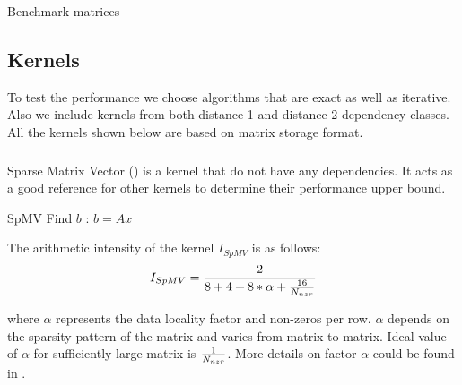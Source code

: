 \begin{table}[ht]
	\footnotesize
	\caption{Benchmark matrices}\label{tab:test_mtx}
	\label{table:bench_matrices}
	\begin{center}
		
	\end{center}

\end{table}

\subsection{Kernels}
To test the performance we choose algorithms that are exact as well as iterative. Also we include kernels from both distance-1 and distance-2 dependency classes. All the kernels shown below are based on \CRS matrix storage format.

\subsubsection{\SpMV}
Sparse Matrix Vector (\SpMV) is a kernel that do not have any dependencies. It  acts as a good reference for other kernels to determine their performance upper bound.
\begin{algorithm}[H]
	\caption{SpMV Find $b$ : $b=A x$} 
	\label{alg:SpMV}
	\begin{algorithmic}[1]
		\ENDFOR
		\ENDFOR
	\end{algorithmic}
\end{algorithm}
The arithmetic intensity of the kernel $I_{SpMV}$ is as follows:
\begin{equation}
\label{eq:SpMV_intensity}
I_{\SpMV} = \frac{2}{8+4+8*\alpha+\frac{16}{\NNZRmath}} \\
\end{equation}

where $\alpha$ represents the data locality factor and \NNZR non-zeros per row. $\alpha$ depends on the sparsity pattern of the matrix and varies from matrix to matrix. Ideal value of $\alpha$ for sufficiently large matrix is $\frac{1}{N_{nzr}}$. More details on factor $\alpha$ could be found in \cite{Moritz_sell}.

